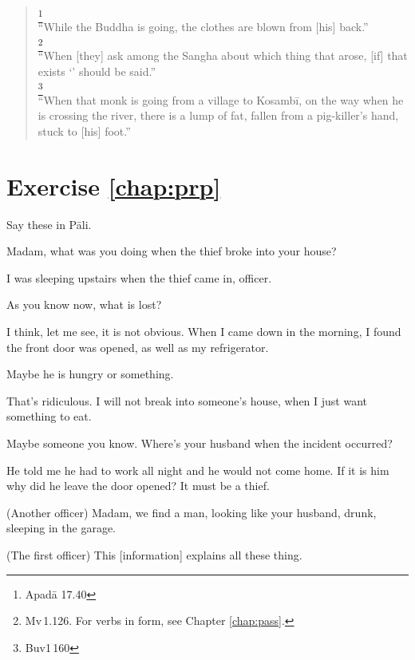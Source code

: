\begin{quote}
\footnote{Apad\=a 17.40}\\
``While the Buddha is going, the clothes are blown from [his] back.''\\[1.5mm]
\footnote{Mv\,1.126. For verbs in  form, see Chapter \ref{chap:pass}.}\\
``When [they] ask among the Sangha about which thing that arose, [if] that exists `' should be said.''\\[1.5mm]
\footnote{Buv1\,160}\\
``When that monk is going from a village to Kosamb\=i, on the way when he is crossing the river, there is a lump of fat, fallen from a pig-killer's hand, stuck to [his] foot.''\\[1.5mm]
\end{quote}

\section*{Exercise \ref{chap:prp}}
Say these in P\=ali.
\begin{compactenum}
\item Madam, what was you doing when the thief broke into your house?
\item I was sleeping upstairs when the thief came in, officer.
\item As you know now, what is lost?
\item I think, let me see, it is not obvious. When I came down in the morning, I found the front door was opened, as well as my refrigerator.
\item Maybe he is hungry or something.
\item That's ridiculous. I will not break into someone's house, when I just want something to eat.
\item Maybe someone you know. Where's your husband when the incident occurred?
\item He told me he had to work all night and he would not come home. If it is him why did he leave the door opened? It must be a thief.
\item (Another officer) Madam, we find a man, looking like your husband, drunk, sleeping in the garage.
\item (The first officer) This [information] explains all these thing.
\end{compactenum}
